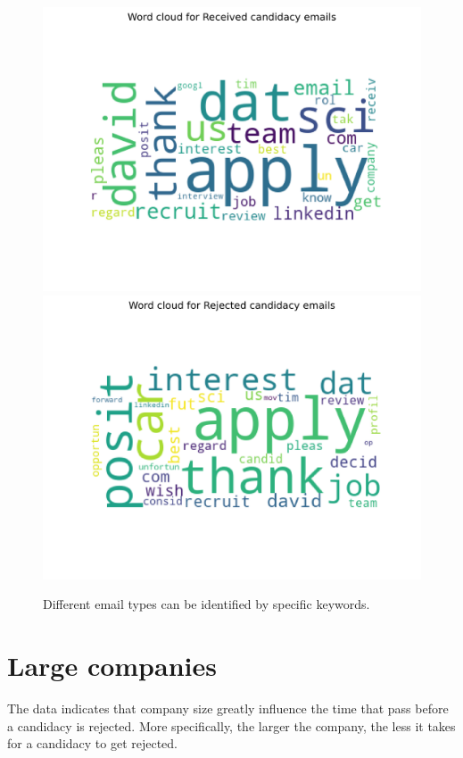 \documentclass[12pt]{article}
\begin{document}
\begin{figure}
    \center
	\includegraphics[width = \linewidth]{wordcloud_Received.png}
	\includegraphics[width = \linewidth]{wordcloud_Rejected.png}
	\caption{Different email types can be identified by specific keywords.  \label{fig:email_keywords}}
\end{figure}

\section{Large companies }
The data indicates that company size greatly influence the time that pass before a candidacy is rejected. More specifically, the larger the company, the less it takes for a candidacy to get rejected.
\end{document}
